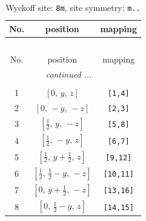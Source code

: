\documentclass[fleqn,8pt]{jsarticle}
\begin{document}
\begin{longtable}{ccc}
\caption{Wyckoff site: {\tt 8m}, site symmetry: {\tt m..}}
 \\
 \hline \hline
No. & position & mapping \\ \hline \endfirsthead

\multicolumn{2}{l}{\tablename\ \thetable{}} \\
 \hline \hline
No. & position & mapping \\ \hline \endhead

 \hline \hline
\multicolumn{2}{r}{\footnotesize\it continued ...} \\ \endfoot

 \hline \hline
\multicolumn{2}{r}{} \\ \endlastfoot

1 & $\left[ 0,\, y,\, z \right]$ & {\tt [1,4]} \\ \hline
2 & $\left[ 0,\, - y,\, - z \right]$ & {\tt [2,3]} \\ \hline
3 & $\left[ \frac{1}{2},\, y,\, - z \right]$ & {\tt [5,8]} \\ \hline
4 & $\left[ \frac{1}{2},\, - y,\, z \right]$ & {\tt [6,7]} \\ \hline
5 & $\left[ \frac{1}{2},\, y + \frac{1}{2},\, z \right]$ & {\tt [9,12]} \\ \hline
6 & $\left[ \frac{1}{2},\, \frac{1}{2} - y,\, - z \right]$ & {\tt [10,11]} \\ \hline
7 & $\left[ 0,\, y + \frac{1}{2},\, - z \right]$ & {\tt [13,16]} \\ \hline
8 & $\left[ 0,\, \frac{1}{2} - y,\, z \right]$ & {\tt [14,15]} \\
\end{longtable}
\renewcommand{\arraystretch}{1.2}
\end{document}
